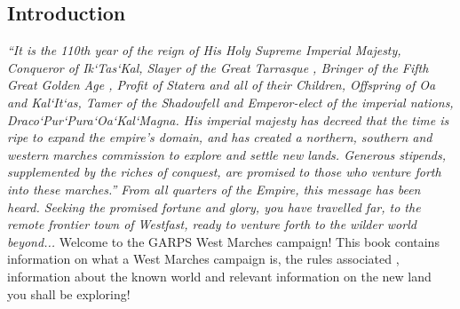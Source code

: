 \begin{onecolumn}
\chapter{Introduction}
\textit{“It is the 110th year of the reign of His Holy Supreme Imperial  Majesty, Conqueror of Ik`Tas`Kal, Slayer of the Great Tarrasque , Bringer of the Fifth Great Golden Age , Profit of Statera and all of their Children, Offspring of Oa and Kal`It`as, Tamer of the Shadowfell and Emperor-elect of the imperial nations, Draco`Pur`Pura`Oa`Kal`Magna.\newline
His imperial majesty has decreed that the time is ripe to expand the empire’s domain, and has created a northern, southern and western marches commission to explore and settle new lands. Generous stipends, supplemented by the riches of conquest, are promised to those who venture forth into these marches.”\newline
\hspace*{\fill}\break
\newline
From all quarters of the Empire, this message has been heard. Seeking the promised fortune and glory, you have travelled far, to the remote frontier town of Westfast, ready to venture forth to the wilder world beyond...
}
\hspace*{\fill}\break
\newline
Welcome to the GARPS West Marches campaign! This book contains information on what a West Marches campaign is, the rules associated , information about the known world and relevant information on the new land you shall be exploring!
\end{onecolumn}
\begin{twocolumn}
\end{twocolumn}